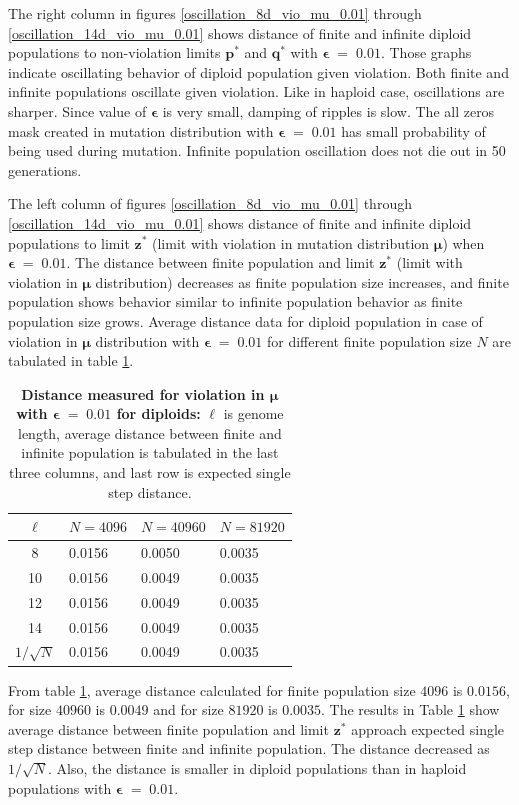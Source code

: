 \clearpage

The right column in figures \ref{oscillation_8d_vio_mu_0.01} through \ref{oscillation_14d_vio_mu_0.01} 
shows distance of finite and infinite diploid populations to non-violation limits $\bm{p^\ast}$ and $\bm{q^\ast}$ with $\bm{\epsilon} \;=\; 0.01$. 
Those graphs indicate oscillating behavior of diploid population given violation. 
Both finite and infinite populations oscillate given violation. Like in haploid case, oscillations are sharper. Since value of $\bm{\epsilon}$ 
is very small, damping of ripples is slow. The all zeros mask created in mutation distribution with $\bm{\epsilon} \;=\; 0.01$ has small 
probability of being used during mutation. Infinite population oscillation does not die out in 50 generations. 

The left column of figures \ref{oscillation_8d_vio_mu_0.01} through \ref{oscillation_14d_vio_mu_0.01} 
shows distance of finite and infinite diploid populations to limit $\bm{z^\ast}$ 
(limit with violation in mutation distribution $\bm{\mu}$) when $\bm{\epsilon} \;=\; 0.01$. 
The distance between finite population and limit $\bm{z}^\ast$ (limit with violation in $\bm{\mu}$ distribution) 
decreases as finite population size increases, 
and finite population shows behavior similar to infinite population behavior as finite population size grows. 
Average distance data for diploid population in case of violation in $\bm{\mu}$ distribution 
with $\bm{\epsilon} \;=\; 0.01$ for different finite population size $N$ are tabulated in table \ref{distanceMuDipEps0.01}.

\begin{table}[ht]
\caption{\textbf{Distance measured for violation in $\bm{\mu}$ with $\bm{\epsilon} \;=\; 0.01$ for diploids:} $\ell$ is genome length, 
average distance between finite and infinite population is tabulated in the last three columns, and last row is expected single step distance.}
\centering
\begin{tabularx}{0.75\textwidth}{ c *{3}{X}}
\toprule
$\ell$ & $N = 4096$ & $N = 40960$ & $N = 81920$ \\
\midrule
8 & 0.0156	&  0.0050	& 0.0035 \\
10 & 0.0156	&  0.0049	& 0.0035 \\
12 & 0.0156	&  0.0049	& 0.0035 \\
14 & 0.0156	&  0.0049	& 0.0035 \\
\midrule
$1/\sqrt{N}$ & 0.0156 & 0.0049 & 0.0035 \\
\bottomrule
\end{tabularx}
\label{distanceMuDipEps0.01}
\end{table}

From table \ref{distanceMuDipEps0.01}, average distance calculated for finite population size $4096$ is $0.0156$, 
for size $40960$ is $0.0049$ and for size $81920$ is $0.0035$. The results in Table \ref{distanceMuDipEps0.01} show average distance 
between finite population and limit $\bm{z^\ast}$ approach expected single step distance 
between finite and infinite population. The distance decreased as $1/\sqrt{N}$. 
Also, the distance is smaller in diploid populations than in haploid populations with $\bm{\epsilon} \;=\; 0.01$.



